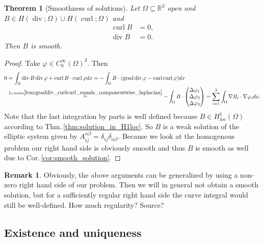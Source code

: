 \documentclass[12pt,a4paper]{article}
\numberwithin{equation}{subsection}
\numberwithin{lemma}{subsection}
\newtheorem{theorem}[lemma]{Theorem}
\theoremstyle{definition}
\newtheorem{remark}[lemma]{Remark}
\DeclareMathOperator{\curl}{curl}
\DeclareMathOperator{\diver}{div}
\DeclareMathOperator{\grad}{grad}
\newcommand{\real}{\mathbb{R}}
\begin{document}
\begin{theorem}[Smoothness of solutions]\label{thm:smoothness_of_solutions}
    Let $\Omega \subseteq \real^3$ open and 
    $B \in H(\diver;\Omega) \cup H(\curl;\Omega)$ and 
    \begin{align*}
        \curl B &= 0,
        \\ \diver B &= 0.
    \end{align*}
    Then $B$ is smooth.
\end{theorem}
\begin{proof}
    Take $\varphi \in C_0^\infty(\Omega)^3$. Then 
    \begin{align*}
        0 &= \int_\Omega \diver B \diver \varphi + \curl B \cdot \curl \varphi dx
        = - \int_\Omega B \cdot (\grad \diver \varphi - \curl \curl \varphi) dx
        \\ &\stackrel{Lemma 
            \ref{lem:graddiv_curlcurl_equals_componentwise_laplacian}}{=} 
            - \int_\Omega B \cdot 
            \begin{pmatrix}
                \Delta \varphi_1 \\ \Delta \varphi_2 \\ \Delta \varphi_3
            \end{pmatrix}
        = \sum\limits_{i=1}^3 \int_\Omega \nabla B_i \cdot \nabla \varphi_i dx.
    \end{align*}
    Note that the last integration by parts is well defined because 
    $B \in H^1_{loc}(\Omega)$ according to Thm.\,\ref{thm:solution_in_H1loc}. 
    So $B$ is a weak solution 
    of the elliptic system given by 
    $A_{ij}^{\alpha \beta} = \delta_{ij} \delta_{\alpha\beta}$. Because 
    we look at the homogenous problem our right hand side is obviously smooth 
    and thus $B$ is smooth as well due to Cor.\,\ref{cor:smooth_solution}.
\end{proof}

\begin{remark}
    Obviously, the above arguments can be generalized by using a 
    non-zero right hand side of our problem. Then we will in general 
    not obtain a smooth solution, but for a sufficiently regular right hand 
    side the curve integral would still be well-defined.
    {\color{red} How much regularity? Source?}
\end{remark}



\subsection{Existence and uniqueness}
\end{document}
